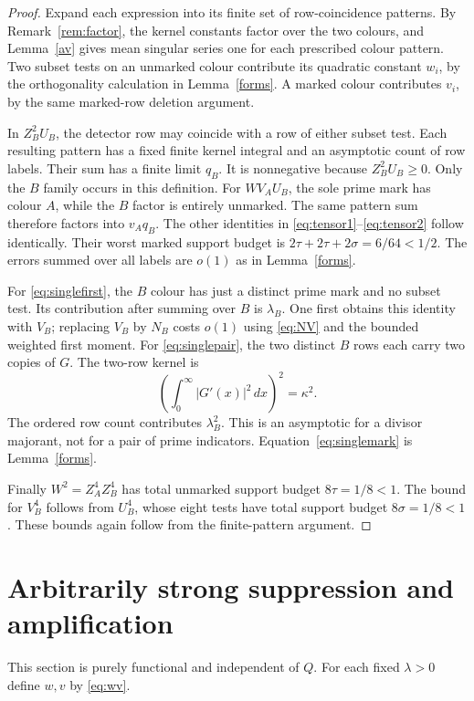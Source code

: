 \documentclass[11pt]{article}
\theoremstyle{remark}
\numberwithin{equation}{section}
\begin{document}
\begin{proof}
Expand each expression into its finite set of row-coincidence
patterns. By Remark~\ref{rem:factor}, the kernel constants factor
over the two colours, and Lemma~\ref{av} gives mean singular
series one for each prescribed colour pattern.
Two subset tests on an unmarked colour contribute its quadratic
constant $w_i$, by the orthogonality calculation in
Lemma~\ref{forms}. A marked colour contributes $v_i$, by the
same marked-row deletion argument.

In $Z_B^2U_B$, the detector row may coincide with a row of either
subset test. Each resulting pattern has a fixed finite kernel
integral and an asymptotic count of row labels. Their sum has a
finite limit $q_B$. It is nonnegative because $Z_B^2U_B\ge0$.
Only the $B$ family occurs in this definition.
For $WV_AU_B$, the sole prime mark has colour $A$, while the
$B$ factor is entirely unmarked. The same pattern sum therefore
factors into $v_Aq_B$. The other identities in
\eqref{eq:tensor1}--\eqref{eq:tensor2} follow identically.
Their worst marked support budget is
$2\tau+2\tau+2\sigma=6/64<1/2$.
The errors summed over all labels are $o(1)$ as in
Lemma~\ref{forms}.

For \eqref{eq:singlefirst}, the $B$ colour has just a distinct
prime mark and no subset test. Its contribution after summing
over $B$ is $\lambda_B$.
One first obtains this identity with $V_B$; replacing $V_B$
by $N_B$ costs $o(1)$ using \eqref{eq:NV} and the bounded
weighted first moment.
For \eqref{eq:singlepair}, the two distinct $B$ rows each carry
two copies of $G$. The two-row kernel is
\[
 \left(\int_0^\infty |G'(x)|^2\,dx\right)^2=\kappa^2.
\]
The ordered row count contributes $\lambda_B^2$.
This is an asymptotic for a divisor majorant, not for a pair
of prime indicators.
Equation~\eqref{eq:singlemark} is Lemma~\ref{forms}.

Finally $W^2=Z_A^4Z_B^4$ has total unmarked support budget
$8\tau=1/8<1$.
The bound for $V_B^4$ follows from $U_B^4$, whose eight tests
have total support budget $8\sigma=1/8<1$.
These bounds again follow from the finite-pattern argument.
\end{proof}


\section{Arbitrarily strong suppression and amplification}
\label{sec:variational}

This section is purely functional and independent of $Q$.
For each fixed $\lambda>0$ define $w,v$ by \eqref{eq:wv}.
\end{document}
